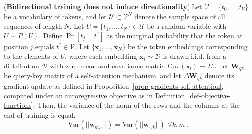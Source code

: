 \begin{corollary}
%
(\textbf{Bidirectional training does not induce directionality})
%
Let \( \mathcal{V} = \{t_0, \dots, t_V\} \) be a vocabulary of tokens, and let \( \mathcal{U} \subset \mathcal{V}^N \) denote the sample space of all sequences of length \( N \). Let \( U = \{t_1, \dots, t_N\} \in \mathcal{U} \) be a random variable with \( U \sim P(U) \). Define \( \Pr[t_j = t^*] \) as the marginal probability that the token at position \( j \) equals \( t^* \in \mathcal{V} \).
%
Let \( \{\bm{x}_1, \dots, \bm{x}_N\} \) be the token embeddings corresponding to the elements of \( U \), where each embedding \( \bm{x}_i \sim \mathcal{D} \) is drawn i.i.d. from a distribution \( \mathcal{D} \) with zero mean and covariance matrix $\text{Cov}(\bm{x}_i)  = \Sigma$..
%
Let \( \bm{W}_{qk} \) be query-key matrix of a self-attention mechanism, and let \( \Delta \bm{W}_{qk} \) denote its gradient update as defined in Proposition~\ref{prop-gradients-self-attention}, computed under an autoregressive objective as in Definition~\ref{def-objective-functions}.
%
Then, the variance of the norm of the rows and the columns at the end of training is equal,
%
%
\begin{equation}
    \text{Var}\left(||\bm{w}_{m, \cdot}||\right) =\text{Var}\left(||\bm{w}_{ \cdot, k}||\right) \,\, \forall k,m \,.
\end{equation}
%
\end{corollary}